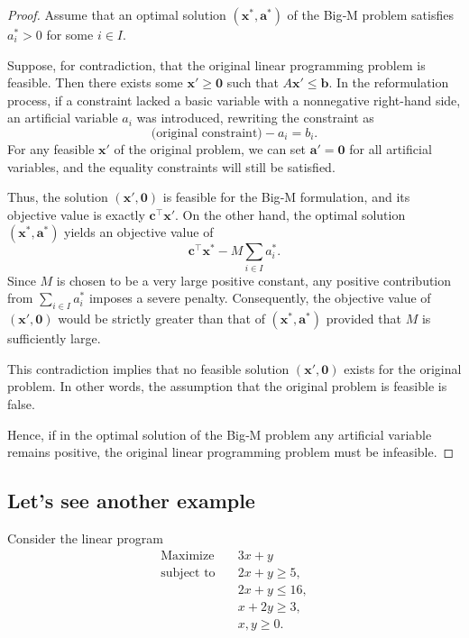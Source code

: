 \begin{proof}
Assume that an optimal solution \((\mathbf{x}^*,\mathbf{a}^*)\) of the Big‑M problem satisfies \(a_i^* > 0\) for some \(i\in I\).

Suppose, for contradiction, that the original linear programming problem is feasible. Then there exists some \(\mathbf{x}'\ge \mathbf{0}\) such that \(A\mathbf{x}' \le \mathbf{b}\). In the reformulation process, if a constraint lacked a basic variable with a nonnegative right-hand side, an artificial variable \(a_i\) was introduced, rewriting the constraint as
\[
\text{(original constraint)} - a_i = b_i.
\]
For any feasible \(\mathbf{x}'\) of the original problem, we can set \(\mathbf{a}' = \mathbf{0}\) for all artificial variables, and the equality constraints will still be satisfied.

Thus, the solution \((\mathbf{x}',\mathbf{0})\) is feasible for the Big‑M formulation, and its objective value is exactly \(\mathbf{c}^\top \mathbf{x}'\). On the other hand, the optimal solution \((\mathbf{x}^*,\mathbf{a}^*)\) yields an objective value of 
\[
\mathbf{c}^\top \mathbf{x}^* - M\sum_{i\in I}a_i^*.
\]
Since \(M\) is chosen to be a very large positive constant, any positive contribution from \(\sum_{i\in I}a_i^*\) imposes a severe penalty. Consequently, the objective value of \((\mathbf{x}',\mathbf{0})\) would be strictly greater than that of \((\mathbf{x}^*,\mathbf{a}^*)\) provided that \(M\) is sufficiently large.

This contradiction implies that no feasible solution \((\mathbf{x}',\mathbf{0})\) exists for the original problem. In other words, the assumption that the original problem is feasible is false.

Hence, if in the optimal solution of the Big‑M problem any artificial variable remains positive, the original linear programming problem must be infeasible.
\end{proof}


\subsection{Let's see another example}


Consider the linear program  
\[
\begin{aligned}
\text{Maximize}\quad & 3x + y \\
\text{subject to}\quad & 2x + y \geq 5, \\
& 2x + y \leq 16, \\
& x + 2y \geq 3, \\
& x, y \geq 0.
\end{aligned}
\]


